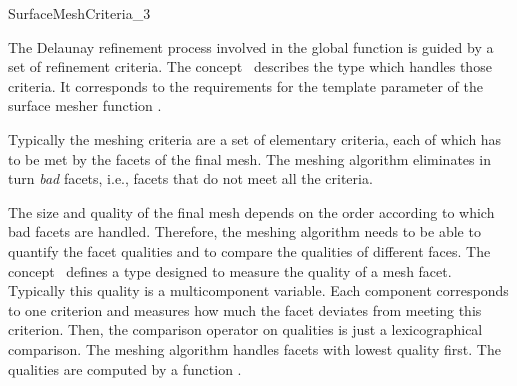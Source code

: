 

\begin{ccRefConcept}{SurfaceMeshCriteria_3}

\ccDefinition
  
The Delaunay refinement process involved in  the 
global function  
is guided by a set of refinement criteria.
The concept \ccRefName\ describes the type  which
handles those criteria. 
It corresponds to the requirements for the template parameter
 of the surface mesher function
.

Typically the meshing criteria are a set
of elementary criteria, each of which
has to be met by  the facets of the final mesh.
The meshing algorithm eliminates in turn  {\em bad} facets, i.e.,
facets that do not meet all the criteria.

The size and quality of the final mesh 
depends on the order according to which bad facets
are handled. Therefore, the meshing algorithm 
needs to be able to quantify the facet qualities and to compare
the qualities of different faces.
The concept \ccRefName\ 
defines a type  designed to measure
the quality of a mesh facet. 
Typically this quality
is a multicomponent variable.  Each component corresponds to
one criterion and measures how much the facet deviates from
meeting this criterion. Then, the  comparison operator on qualities
is just a lexicographical comparison. The meshing algorithm handles facets
with lowest quality first. The qualities are computed by a function
\ccc{is_bad(Facet f, Quality& q)}.

\ccTypes



\end{ccRefConcept}
